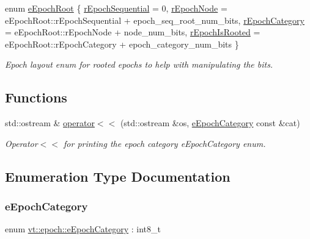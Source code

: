 \begin{DoxyCompactItemize}
\item 
enum \hyperlink{namespacevt_1_1epoch_a03454759f2f9572f84e51fdb7d76007d}{e\+Epoch\+Root} \{ \hyperlink{namespacevt_1_1epoch_a03454759f2f9572f84e51fdb7d76007dabcd342843facde01d354a2456ae5ed1f}{r\+Epoch\+Sequential} = 0, 
\hyperlink{namespacevt_1_1epoch_a03454759f2f9572f84e51fdb7d76007da19f3b4d1d3a2178e5e4a66f0a260520b}{r\+Epoch\+Node} = e\+Epoch\+Root\+:\+:r\+Epoch\+Sequential + epoch\+\_\+seq\+\_\+root\+\_\+num\+\_\+bits, 
\hyperlink{namespacevt_1_1epoch_a03454759f2f9572f84e51fdb7d76007da39238912b8dfc520dab52217f960c860}{r\+Epoch\+Category} = e\+Epoch\+Root\+:\+:r\+Epoch\+Node + node\+\_\+num\+\_\+bits, 
\hyperlink{namespacevt_1_1epoch_a03454759f2f9572f84e51fdb7d76007daac0bb1e87c328e3165a0114430693cb8}{r\+Epoch\+Is\+Rooted} = e\+Epoch\+Root\+:\+:r\+Epoch\+Category + epoch\+\_\+category\+\_\+num\+\_\+bits
 \}\begin{DoxyCompactList}\small\item\em Epoch layout enum for rooted epochs to help with manipulating the bits. \end{DoxyCompactList}
\end{DoxyCompactItemize}
\subsection*{Functions}
\begin{DoxyCompactItemize}
\item 
std\+::ostream \& \hyperlink{namespacevt_1_1epoch_ac6e7a477d5b11270b5b1e6f7a70e3bd5}{operator$<$$<$} (std\+::ostream \&os, \hyperlink{namespacevt_1_1epoch_a956abe0aceef0d10a988de8acb002c7c}{e\+Epoch\+Category} const \&cat)
\begin{DoxyCompactList}\small\item\em Operator$<$$<$ for printing the epoch category {\ttfamily e\+Epoch\+Category} enum. \end{DoxyCompactList}\end{DoxyCompactItemize}


\subsection{Enumeration Type Documentation}
\mbox{\label{namespacevt_1_1epoch_a956abe0aceef0d10a988de8acb002c7c}} 
\subsubsection{\texorpdfstring{e\+Epoch\+Category}{eEpochCategory}}
{\footnotesize\ttfamily enum \hyperlink{namespacevt_1_1epoch_a956abe0aceef0d10a988de8acb002c7c}{vt\+::epoch\+::e\+Epoch\+Category} \+: int8\+\_\+t\hspace{0.3cm}{\ttfamily [strong]}}



